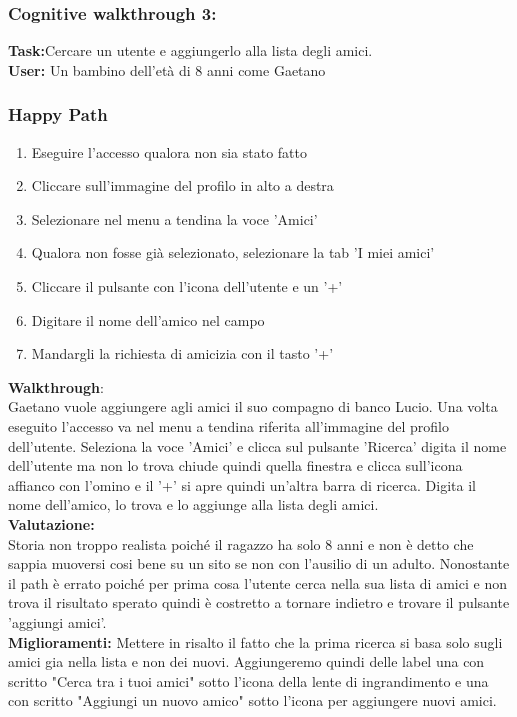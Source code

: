 \documentclass[../Report.tex]{subfiles}
\begin{document}
    \subsubsection{Cognitive walkthrough 3:}
    \textbf{Task:}Cercare un utente e aggiungerlo alla lista degli amici.\\
    \textbf{User:} Un bambino dell'età di 8 anni come Gaetano
    \subsubsection{Happy Path}
    \begin{enumerate}
        \item Eseguire l'accesso qualora non sia stato fatto 
        \item Cliccare sull'immagine del profilo in alto a destra
        \item Selezionare nel menu a tendina la voce 'Amici'
        \item Qualora non fosse già selezionato, selezionare la tab 'I miei amici'
        \item Cliccare il pulsante con l'icona dell'utente e un '+'
        \item Digitare il nome dell'amico nel campo
        \item Mandargli la richiesta di amicizia con il tasto '+'
    \end{enumerate}
    \textbf{Walkthrough}:\\
    Gaetano vuole aggiungere agli amici il suo compagno di banco Lucio. Una volta eseguito l'accesso va nel menu a tendina riferita all'immagine del profilo dell'utente.
    Seleziona la voce 'Amici' e clicca sul pulsante 'Ricerca' digita il nome dell'utente ma non lo trova chiude quindi quella finestra e clicca sull'icona affianco con l'omino e il '+' si apre quindi un'altra barra di ricerca.
    Digita il nome dell'amico, lo trova e lo aggiunge alla lista degli amici.\\

    \textbf{Valutazione:}\\Storia non troppo realista poiché il ragazzo ha solo 8 anni e non è detto che sappia muoversi cosi bene su un sito se non con l'ausilio di un adulto.
    Nonostante il path è errato poiché per prima cosa l'utente cerca nella sua lista di amici e non trova il risultato sperato quindi è costretto a tornare indietro e trovare il pulsante 'aggiungi amici'.\\

    \textbf{Miglioramenti:} Mettere in risalto il fatto che la prima ricerca si basa solo sugli amici gia nella lista e non dei nuovi. Aggiungeremo quindi delle label una con scritto "Cerca tra i tuoi amici" sotto l'icona della lente di ingrandimento e una con scritto "Aggiungi un nuovo amico" sotto l'icona per aggiungere nuovi amici. 
\end{document}
